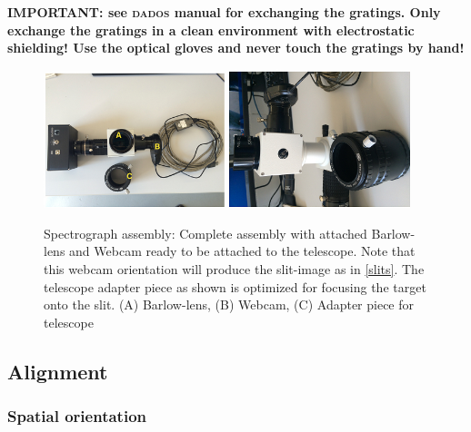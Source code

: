 \documentclass[a4paper, 11pt, fleqn]{memoir}
\begin{document}
\textbf{IMPORTANT: see \textsc{dados} manual for exchanging the gratings.
    Only exchange the gratings in a clean environment with electrostatic shielding!
    Use the optical gloves and never touch the gratings by hand!
}

\begin{figure}[t!]
    \centering
    \includegraphics[width=0.47\textwidth]{dados-assembly-3}
    \includegraphics[width=0.47\textwidth]{dados-assembly-4}
    \caption{Spectrograph assembly:  \newline Complete assembly with attached Barlow-lens and Webcam ready to be attached to the telescope.
        Note that this webcam orientation will produce the slit-image as in \cref{slits}.
        The telescope adapter piece as shown is optimized for focusing the target onto the slit.
        \newline (A) Barlow-lens, (B) Webcam, (C) Adapter piece for telescope }
    \label{dados complete}
\end{figure}

\subsection{Alignment}\label{spectrograph alignment}

\subsubsection{Spatial orientation}
\end{document}
